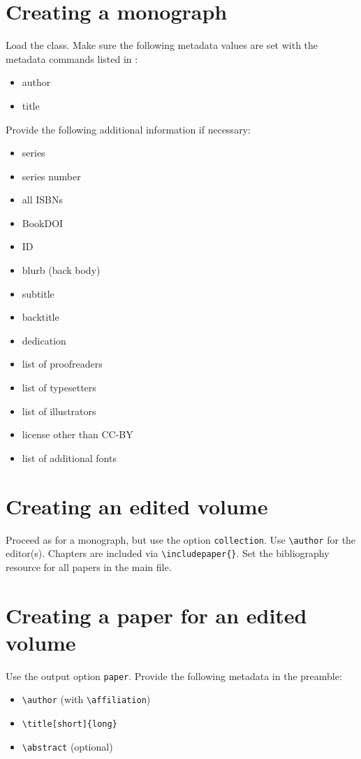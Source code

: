\documentclass[output=guidelines]{langscibook}
\begin{document}
\section{Creating a monograph}
Load the class. Make sure the following metadata values are set with the metadata commands listed in :

\begin{itemize}
 \item author
 \item title
\end{itemize}

Provide the following additional information if necessary:
\begin{itemize}
 \item series
 \item series number
 \item all ISBNs
 \item BookDOI
 \item ID
 \item blurb (back body)
 \item subtitle
 \item backtitle
 \item dedication
 \item list of proofreaders
 \item list of typesetters
 \item list of illustrators
 \item license other than CC-BY
 \item list of additional fonts
\end{itemize}


\section{Creating an edited volume}
Proceed as for a monograph, but use the option \texttt{collection}. Use \verb+\author+ for the editor(s).
Chapters are included via \verb+\includepaper{}+. Set the bibliography resource for all papers in the main file.


\section{Creating a paper for an edited volume}
Use the output option \texttt{paper}. Provide the following metadata in the preamble:
\begin{itemize}
 \item \verb+\author+ (with \verb+\affiliation+)
 \item \verb+\title[short]{long}+
 \item \verb+\abstract+ (optional)
\end{itemize}
\end{document}
